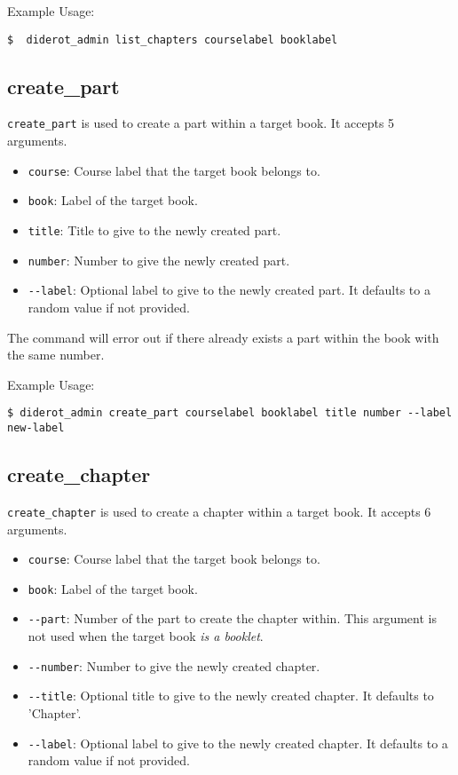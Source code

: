 Example Usage:
\begin{verbatim}
$  diderot_admin list_chapters courselabel booklabel
\end{verbatim}

\subsection{create\_part}

\verb|create_part| is used to create a part within a target book. It accepts 5 arguments.

\begin{itemize}
  \item \verb|course|: Course label that the target book belongs to.
  \item \verb|book|: Label of the target book.
  \item \verb|title|: Title to give to the newly created part.
  \item \verb|number|: Number to give the newly created part.
  \item \verb|--label|: Optional label to give to the newly created part. It defaults to a random value if not provided.
\end{itemize}

The command will error out if there already exists a part within the book with the same number.

Example Usage:
\begin{verbatim}
$ diderot_admin create_part courselabel booklabel title number --label new-label
\end{verbatim}


\subsection{create\_chapter}

\verb|create_chapter| is used to create a chapter within a target book. It accepts 6 arguments.

\begin{itemize}
  \item \verb|course|: Course label that the target book belongs to.
  \item \verb|book|: Label of the target book.
  \item \verb|--part|: Number of the part to create the chapter within. This argument is not used when the target book \emph{is a booklet}.
  \item \verb|--number|: Number to give the newly created chapter.
  \item \verb|--title|: Optional title to give to the newly created chapter. It defaults to 'Chapter'.
  \item \verb|--label|: Optional label to give to the newly created chapter. It defaults to a random value if not provided.
\end{itemize}


